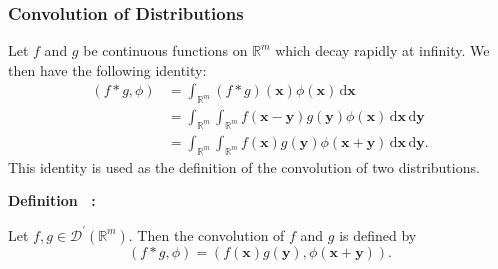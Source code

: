 \subsubsection{Convolution of Distributions}\label{subsec:distribution-convolution}

Let $f$ and $g$ be continuous functions on $\mathbb{R}^m$ which decay rapidly at infinity. We then have the following identity:
\begin{equation}\label{eq:convolution-test-pairing-integral-identity}
\begin{aligned}
(f*g,\phi)&=\int_{\mathbb{R}^m}(f*g)(\bm{x})\phi(\bm{x})\,\mathrm{d}\bm{x}\\
&=\int_{\mathbb{R}^m}\int_{\mathbb{R}^m}f(\bm{x}-\bm{y})g(\bm{y})\phi(\bm{x})\,\mathrm{d}\bm{x}\,\mathrm{d}\bm{y}\\
&=\int_{\mathbb{R}^m}\int_{\mathbb{R}^m}f(\bm{x})g(\bm{y})\phi(\bm{x}+\bm{y})\,\mathrm{d}\bm{x}\,\mathrm{d}\bm{y}.
\end{aligned}
\end{equation}
This identity is used as the definition of the convolution of two distributions.

\begingroup
{}
{
    {\sffamily\bfseries\color{PageColor}\fontsize{10.95}{13.2}\selectfont
     \textquotedbl Definition\textquotedbl~\thestatement
     \textbf{:}}\quad
    \kaishu
}
{\par}
\begin{Definition}
\label{def:distribution-convolution-formal}
Let $f,g\in\mathcal{D}^{\prime}(\mathbb{R}^m)$. Then the convolution of $f$ and $g$ is defined by
\begin{equation}\label{eq:distribution-convolution-formal-definition}
(f*g,\phi)=(f(\bm{x})g(\bm{y}),\phi(\bm{x}+\bm{y})).
\end{equation}

\end{Definition}
\endgroup

